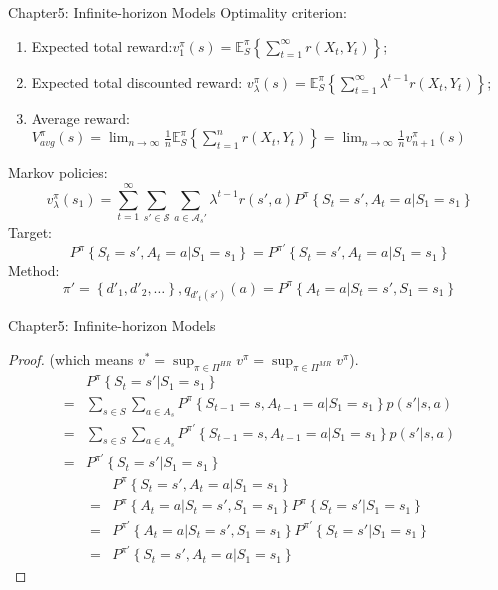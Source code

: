 \documentclass{beamer}
\begin{document}
\begin{frame}[shrink]{Chapter5: Infinite-horizon Models}
    Optimality criterion:
    \begin{enumerate}
        \item Expected total reward:$ v_1^\pi(s) = \mathbb{E}^\pi_S \left\{ \sum^{\infty}_{t=1} r(X_t, Y_t) \right\} $;
        \item Expected total discounted reward: $ v^\pi_\lambda(s) = \mathbb{E}^\pi_S \left\{ \sum^{\infty}_{t=1} \lambda^{t-1} r(X_t, Y_t) \right\} $;
        \item Average reward: $ V_{avg}^\pi(s) = \lim_{n \to \infty} \frac{1}{n} \mathbb{E}^\pi_S \left\{ \sum^{n}_{t=1} r(X_t, Y_t) \right\} = \lim_{n \to \infty} \frac{1}{n} v^\pi_{n+1}(s) $
    \end{enumerate}

    
    Markov policies:
    \[
        v^\pi_\lambda(s_1) = \sum^{\infty}_{t=1} \sum^{}_{s' \in \mathcal{S}} \sum^{}_{a \in \mathcal{A}_s'} \lambda^{t-1} r(s',a) P^\pi \left\{ S_t = s', A_t = a | S_1 = s_1 \right\}
    \]
    Target:
    \[
        P^\pi \left\{ S_t = s', A_t = a | S_1 = s_1 \right\} = P^{\pi'} \left\{ S_t = s', A_t = a | S_1 = s_1 \right\} 
    \]
    Method:
    \[
        \pi' = \left\{ d'_1, d'_2, \ldots \right\},
        q_{d'_t(s')} (a) = P^\pi \left\{ A_t = a | S_t = s', S_1 = s_1 \right\}
    \]
\end{frame}

\begin{frame}[shrink]{Chapter5: Infinite-horizon Models}
    \begin{proof} 
        (which means $ v^* = \sup_{\pi \in \Pi^{HR}} v^{\pi} = \sup_{\pi \in \Pi^{MR}} v^{\pi} $).
        \begin{align*}
            &P^\pi\left\{ S_t = s' | S_1 = s_1 \right\} \\
            =& \sum^{}_{s \in S} \sum^{}_{a \in A_s} P^\pi\left\{ S_{t-1}=s, A_{t-1}=a | S_1 = s_1 \right\} p(s' | s, a) \\
            =& \sum^{}_{s \in S} \sum^{}_{a \in A_s} P^{\pi'}\left\{ S_{t-1}=s, A_{t-1}=a | S_1 = s_1 \right\} p(s' | s, a) \\
            =& P^{\pi'}\left\{ S_t = s' | S_1 = s_1 \right\}
        \end{align*}
        \begin{align*}
             & P^\pi\left\{S_t = s', A_t = a | S_1 = s_1\right\}\\
            =& P^\pi\left\{A_t = a | S_t = s', S_1 = s_1\right\} P^\pi\left\{ S_t = s' | S_1 = s_1 \right\}\\
            =& P^{\pi'}\left\{A_t = a | S_t = s', S_1 = s_1\right\} P^{\pi'}\left\{ S_t = s' | S_1 = s_1 \right\}\\
            =& P^{\pi'}\left\{S_t = s', A_t = a | S_1 = s_1\right\}
        \end{align*}
    \end{proof}
\end{frame}
\end{document}

